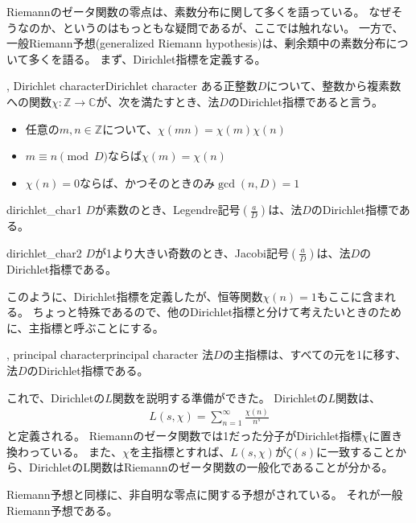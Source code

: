 Riemannのゼータ関数の零点は、素数分布に関して多くを語っている。
なぜそうなのか、というのはもっともな疑問であるが、ここでは触れない。
一方で、一般Riemann予想(generalized Riemann hypothesis)は、剰余類中の素数分布について多くを語る。
まず、Dirichlet指標を定義する。

\begin{Defi}{, Dirichlet character}{Dirichlet character}
ある正整数$D$について、整数から複素数への関数$\chi:\mathbb{Z}\to\mathbb{C}$が、次を満たすとき、法$D$のDirichlet指標であると言う。
\begin{itemize}
\item 任意の$m,n\in\mathbb{Z}$について、$\chi(mn)=\chi(m)\chi(n)$
\item $m\equiv n \pmod{D}$ならば$\chi(m)=\chi(n)$
\item $\chi(n)=0$ならば、かつそのときのみ$\gcd(n, D) = 1$
\end{itemize}
\end{Defi}

\begin{Exam}{}{dirichlet_char1}
$D$が素数のとき、Legendre記号$\left(\frac{a}{D}\right)$は、法$D$のDirichlet指標である。
\end{Exam}

\begin{Exam}{}{dirichlet_char2}
$D$が1より大きい奇数のとき、Jacobi記号$\left(\frac{a}{D}\right)$は、法$D$のDirichlet指標である。
\end{Exam}

このように、Dirichlet指標を定義したが、恒等関数$\chi(n)=1$もここに含まれる。
ちょっと特殊であるので、他のDirichlet指標と分けて考えたいときのために、主指標と呼ぶことにする。

\begin{Defi}{, principal character}{principal character}
法$D$の主指標は、すべての元を1に移す、法$D$のDirichlet指標である。
\end{Defi}

これで、Dirichletの$L$関数を説明する準備ができた。
Dirichletの$L$関数は、
\begin{align*}
L(s,\chi) = \sum_{n=1}^{\infty} \frac{\chi(n)}{n^s}
\end{align*}
と定義される。
Riemannのゼータ関数では1だった分子がDirichlet指標$\chi$に置き換わっている。
また、$\chi$を主指標とすれば、$L(s, \chi)$が$\zeta(s)$に一致することから、DirichletのL関数はRiemannのゼータ関数の一般化であることが分かる。

Riemann予想と同様に、非自明な零点に関する予想がされている。
それが一般Riemann予想である。

